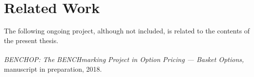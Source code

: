 \documentclass{UUThesisTemplate}
\begin{document}
    \chapter*{Related Work}
    \noindent The following ongoing project, although not included, is related to the contents of the present thesis.\\\\
    \emph{BENCHOP: The BENCHmarking Project in Option Pricing --- Basket Options,}  	  
    manuscript in preparation, 2018. \label{paper7}	

    \begingroup
        \tableofcontents
    \endgroup

\mainmatter
%    
%    
%    

%    
%
%
\end{document}

